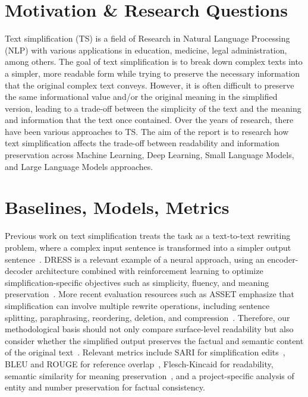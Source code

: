 \documentclass[11pt,a4paper]{article}
\begin{document}
\section*{Motivation \& Research Questions}
Text simplification (TS) is a field of Research in Natural Language Processing (NLP) with various applications in education, medicine, legal administration, among others. The goal of text simplification is to break down complex texts into a simpler, more readable form while trying to preserve the necessary information that the original complex text conveys\cite{Shardlow2014}. However, it is often difficult to preserve the same informational value and/or the original meaning in the simplified version, leading to a trade-off between the simplicity of the text and the meaning and information that the text once contained. Over the years of research, there have been various approaches to TS. The aim  of the report is to research how text simplification affects the trade-off between readability and information preservation across Machine Learning, Deep Learning, Small Language Models, and Large Language Models approaches.

\section{Baselines, Models, Metrics}
Previous work on text simplification treats the task as a text-to-text rewriting problem,
where a complex input sentence is transformed into a simpler output sentence~\cite{XuEtAl2016}. DRESS is a relevant example of a neural approach, using an encoder-decoder architecture combined with reinforcement learning
to optimize simplification-specific objectives such as simplicity, fluency, and meaning preservation~\cite{zhang-lapata-2017-sentence}.
More recent evaluation resources such as ASSET emphasize that simplification can involve multiple rewrite operations,
including sentence splitting, paraphrasing, reordering, deletion, and compression~\cite{AlvaManchegoEtAl2020}.
Therefore, our methodological basis should not only compare surface-level readability but also consider whether the simplified output preserves 
the factual and semantic content of the original text~\cite{XuEtAl2016,zhang-lapata-2017-sentence,AlvaManchegoEtAl2020}. Relevant metrics include SARI for simplification edits~\cite{XuEtAl2016},
BLEU and ROUGE for reference overlap~\cite{PapineniEtAl2002,Lin2004},
Flesch-Kincaid for readability,
semantic similarity for meaning preservation~\cite{zhang-lapata-2017-sentence},
and a project-specific analysis of entity and number preservation for factual consistency.
\end{document}

